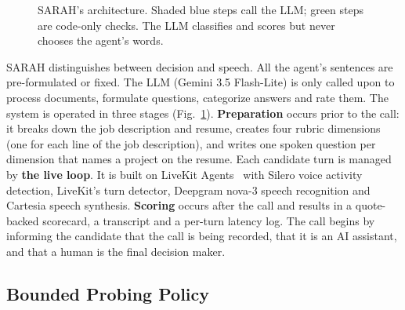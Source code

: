 \documentclass[conference]{IEEEtran}
\begin{document}
\begin{figure}[t]
{}
\caption{SARAH's architecture. Shaded blue steps call the LLM; green steps are code-only checks. The LLM classifies and scores but never chooses the agent's words.}
\label{fig:arch}
\end{figure}


SARAH distinguishes between decision and speech. All the agent's sentences are pre-formulated or fixed. The LLM (Gemini 3.5 Flash-Lite) is only called upon to process documents, formulate questions, categorize answers and rate them. The system is operated in three stages (Fig.~\ref{fig:arch}). \textbf{Preparation} occurs prior to the call: it breaks down the job description and resume, creates four rubric dimensions (one for each line of the job description), and writes one spoken question per dimension that names a project on the resume. Each candidate turn is managed by \textbf{the live loop}. It is built on LiveKit Agents~\cite{livekit} with Silero voice activity detection, LiveKit's turn detector, Deepgram nova-3 speech recognition and Cartesia speech synthesis. \textbf{Scoring} occurs after the call and results in a quote-backed scorecard, a transcript and a per-turn latency log. The call begins by informing the candidate that the call is being recorded, that it is an AI assistant, and that a human is the final decision maker.



\subsection{Bounded Probing Policy}
\end{document}
